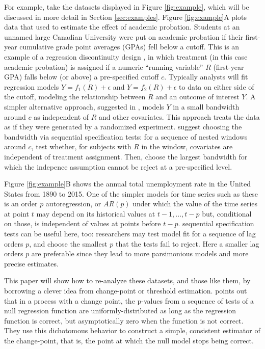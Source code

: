 \documentclass[lineno]{biometrika}\usepackage[]{graphicx}\usepackage[]{color}
\begin{document}
For example, take the datasets displayed in Figure \ref{fig:example},
which will be discussed in more detail in Section \ref{sec:examples}.
Figure \ref{fig:example}A plots data that \citet{lso} used to estimate the effect of academic
probation.
Students at an unnamed large Canadian University were put on academic
probation if their first-year cumulative grade point averages
(GPAs) fell below a cutoff.
This is an example of a regression discontinuity design \citep{thistlewhiteCampbell}, in
which treatment (in this case academic probation) is assigned if a
numeric ``running variable'' $R$ (first-year GPA) falls below (or above) a
pre-specified cutoff $c$.
Typically \citep[e.g.][]{imbensLemiuxRDD,angristLavy,lee} analysts
will fit regression models $Y=f_1(R)+\epsilon$ and $Y=f_2(R)+\epsilon$
to data on either side of the cutoff, modeling the relationship
between $R$ and an outcome of interest $Y$.
A simpler alternative approach, suggested in \citet{cft}, models $Y$ in a small bandwidth around $c$ as
independent of $R$ and other covariates.
This approach treats the data as if they were generated by a randomized
experiment.
\citet{cft} suggest choosing the bandwidth via sequential
specification tests: for a sequence of
nested windows around $c$, test whether, for subjects with $R$ in the window,
covariates are independent of treatment assignment.
Then, choose the largest bandwidth for which the indepence assumption
cannot be reject at a pre-specified level.

Figure \ref{fig:example}B shows the annual total unemployment rate in the
United States from 1890 to 2015.
One of the simpler models for time series such as these is an order
$p$ autoregression, or $AR(p)$ under which the value of the time
series at point $t$ may depend on its historical values at
$t-1,...,t-p$ but, conditional on those, is independent of values at
points before $t-p$.
sequential specification tests can be useful here, too: researchers may test model fit for a
sequence of lag orders $p$, and choose the smallest $p$ that the tests
fail to reject.
Here a smaller lag orders $p$ are preferable since they lead to more
parsimonious models and more precise estimates.

This paper will show how to re-analyze these datasets, and those like
them, by borrowing a clever idea from change-point or threshold
estimation.
\citet{mallik} points out that in a process with a change point,
the p-values from a sequence of tests of a null regression function
are uniformly-distributed as long as the regression function is
correct, but asymptotically zero when the function is not correct.
They use this dichotomous behavior to construct a simple, consistent
estimator of the change-point, that is, the point at which the null model
stops being correct.
\end{document}
